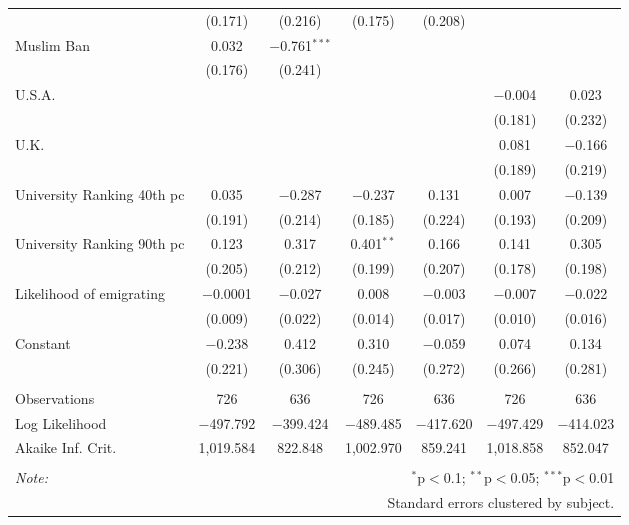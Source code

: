 \begin{sidewaystable}[!htbp]
\begin{tabular}{@{\extracolsep{5pt}}lcccccc}
  & (0.171) & (0.216) & (0.175) & (0.208) &  &  \\ 
  Muslim Ban & 0.032 & $-$0.761$^{***}$ &  &  &  &  \\ 
  & (0.176) & (0.241) &  &  &  &  \\ 
  U.S.A. &  &  &  &  & $-$0.004 & 0.023 \\ 
  &  &  &  &  & (0.181) & (0.232) \\ 
  U.K. &  &  &  &  & 0.081 & $-$0.166 \\ 
  &  &  &  &  & (0.189) & (0.219) \\ 
  University Ranking 40th pc & 0.035 & $-$0.287 & $-$0.237 & 0.131 & 0.007 & $-$0.139 \\ 
  & (0.191) & (0.214) & (0.185) & (0.224) & (0.193) & (0.209) \\ 
  University Ranking 90th pc & 0.123 & 0.317 & 0.401$^{**}$ & 0.166 & 0.141 & 0.305 \\ 
  & (0.205) & (0.212) & (0.199) & (0.207) & (0.178) & (0.198) \\ 
  Likelihood of emigrating & $-$0.0001 & $-$0.027 & 0.008 & $-$0.003 & $-$0.007 & $-$0.022 \\ 
  & (0.009) & (0.022) & (0.014) & (0.017) & (0.010) & (0.016) \\ 
  Constant & $-$0.238 & 0.412 & 0.310 & $-$0.059 & 0.074 & 0.134 \\ 
  & (0.221) & (0.306) & (0.245) & (0.272) & (0.266) & (0.281) \\ 
 \hline \\[-1.8ex] 
Observations & 726 & 636 & 726 & 636 & 726 & 636 \\ 
Log Likelihood & $-$497.792 & $-$399.424 & $-$489.485 & $-$417.620 & $-$497.429 & $-$414.023 \\ 
Akaike Inf. Crit. & 1,019.584 & 822.848 & 1,002.970 & 859.241 & 1,018.858 & 852.047 \\ 
\hline 
\hline \\[-1.8ex] 
\textit{Note:}  & \multicolumn{6}{r}{$^{*}$p$<$0.1; $^{**}$p$<$0.05; $^{***}$p$<$0.01} \\ 
 & \multicolumn{6}{r}{Standard errors clustered by subject.} \\ 
\end{tabular} 
\end{sidewaystable} 
